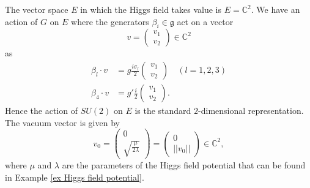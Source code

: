\documentclass[12pt]{amsart}
\theoremstyle{definition}
\theoremstyle{remark}
\numberwithin{equation}{section}
\begin{document}
The vector space $E$ in which the Higgs field takes value is $E=\mathbb{C}^2$. We have an action of $G$ on $E$ where the generators $\beta_i\in\mathfrak{g}$ act on a vector 
\begin{equation*}
v=\left(\begin{array}{c}v_1\\v_2\end{array}\right)\in\mathbb{C}^2
\end{equation*}
as 
\begin{align*}
\beta_l\cdot v&=g\frac{i\sigma_l}{2}\left(\begin{array}{c}v_1\\v_2\end{array}\right)\quad(l=1,2,3)\\
\beta_4\cdot v&=g'\frac{i}{2}\left(\begin{array}{c}v_1\\v_2\end{array}\right).
\end{align*}
Hence the action of $SU(2)$ on $E$ is the standard $2$-dimensional representation. The vacuum vector is given by 
\begin{equation*}
v_0=\left(\begin{array}{c}0\\\sqrt{\frac{\mu}{2\lambda}}\end{array}\right)=\left(\begin{array}{c}0\\||v_0||\end{array}\right)\in\mathbb{C}^2,
\end{equation*}
where $\mu$ and $\lambda$ are the parameters of the Higgs field potential that can be found in Example \ref{ex Higgs field potential}.
\end{document}
